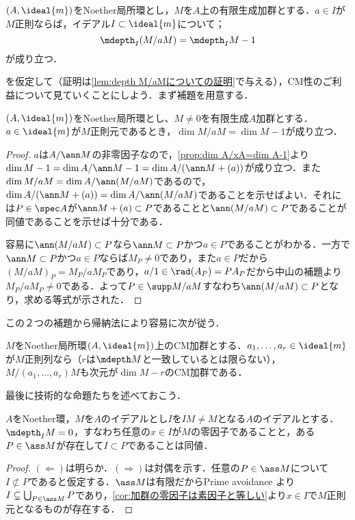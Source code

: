 \begin{lem}\label{lem:depth M/aM=depth M-1}
	$(A,\ideal{m})$をNoether局所環とし，$M$を$A$上の有限生成加群とする．$a\in I$が$M$正則ならば，イデアル$I\subset\ideal{m}$について；
	\[\mdepth_I (M/aM)=\mdepth_I M-1\]
	が成り立つ．
\end{lem}

を仮定して（証明は\ref{lem:depth M/aMについての証明}で与える），CM性のご利益について見ていくことにしよう．まず補題を用意する．

\begin{lem}\label{lem:dim M/aM=dim M-1}
	$(A,\ideal{m})$をNoether局所環とし、$M\neq0$を有限生成$A$加群とする．$a\in\ideal{m}$が$M$正則元であるとき，$\dim M/aM=\dim M-1$が成り立つ．
\end{lem}

\begin{proof}
	$a$は$A/\ann M$の非零因子なので，\ref{prop:dim A/xA=dim A-1}より$\dim M-1=\dim A/\ann M-1=\dim A/(\ann M+(a))$が成り立つ．また$\dim M/aM=\dim A/\ann(M/aM)$であるので，$\dim A/(\ann M+(a))=\dim A/\ann(M/aM)$であることを示せばよい．それには$P\in\spec A$が$\ann M+(a)\subset P$であることと$\ann(M/aM)\subset P$であることが同値であることを示せば十分である．
	
	容易に$\ann(M/aM)\subset P$なら$\ann M\subset P$かつ$a\in P$であることがわかる．一方で$\ann M\subset P$かつ$a\in P$ならば$M_P\neq0$であり，また$a\in P$だから$(M/aM)_P=M_P/aM_P$であり，$a/1\in\rad (A_P)=PA_P$だから中山の補題より$M_P/aM_P\neq0$である．よって$P\in\supp M/aM$すなわち$\ann(M/aM)\subset P$となり，求める等式が示された．
\end{proof}

この２つの補題から帰納法により容易に次が従う．
\begin{cor}\label{cor:CMの正則列による商もCM}
	$M$をNoether局所環$(A,\ideal{m})$上のCM加群とする．$a_1,\dots,a_r\in\ideal{m}$が$M$正則列なら（$r$は$\mdepth M$と一致しているとは限らない），$M/(a_1,\dots,a_r)M$も次元が$\dim M-r$のCM加群である．
\end{cor}

最後に技術的な命題たちを述べておこう．

\begin{lem}\label{lem:depth 0とass}
	$A$をNoether環，$M$を$A$のイデアルとし$I$を$IM\neq M$となる$A$のイデアルとする．$\mdepth_I M=0$，すなわち任意の$x\in I$が$M$の零因子であることと，ある$P\in\ass M$が存在して$I\subset P$であることは同値．
\end{lem}

\begin{proof}
	$(\Longleftarrow)$は明らか．$(\Longrightarrow)$は対偶を示す．任意の$P\in\ass M$について$I\not\subset P$であると仮定する．$\ass M$は有限だからPrime avoidance より$I\subsetneq\bigcup_{P\in\ass M}P$であり，\ref{cor:加群の零因子は素因子と等しい}より$x\in I$で$M$正則元となるものが存在する．
\end{proof}

